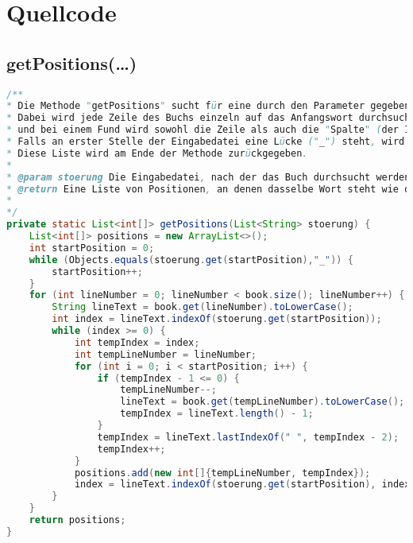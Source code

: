 \documentclass[a4paper, 10pt, ngerman]{scrartcl}
\begin{document}
\section{Quellcode}\label{sec:quellcode}
\subsection{getPositions(\ldots)}\label{sec:getPositions()}
\begin{lstlisting}[frame=single, language=Java, title=Methode getPositions, breaklines=true, label=lst:getPosition]
/**
* Die Methode "getPositions" sucht für eine durch den Parameter gegebene Eingabedatei das erste Wort im Buch.
* Dabei wird jede Zeile des Buchs einzeln auf das Anfangswort durchsucht
* und bei einem Fund wird sowohl die Zeile als auch die "Spalte" (der Index in der Zeile, an der das Wort beginnt) als Array an die Liste von Positionen hinzugefügt.
* Falls an erster Stelle der Eingabedatei eine Lücke ("_") steht, wird nach dem zweiten Wort gesucht und dann die Position für das vorherige Wort bestimmt.
* Diese Liste wird am Ende der Methode zurückgegeben.
*
* @param stoerung Die Eingabedatei, nach der das Buch durchsucht werden soll
* @return Eine Liste von Positionen, an denen dasselbe Wort steht wie das erste Wort der Eingabedatei
*
*/
private static List<int[]> getPositions(List<String> stoerung) {
	List<int[]> positions = new ArrayList<>();
    int startPosition = 0;
    while (Objects.equals(stoerung.get(startPosition),"_")) {
    	startPosition++;
    }
    for (int lineNumber = 0; lineNumber < book.size(); lineNumber++) {
        String lineText = book.get(lineNumber).toLowerCase();
        int index = lineText.indexOf(stoerung.get(startPosition));
        while (index >= 0) {
        	int tempIndex = index;
            int tempLineNumber = lineNumber;
            for (int i = 0; i < startPosition; i++) {
                if (tempIndex - 1 <= 0) {
                    tempLineNumber--;
                    lineText = book.get(tempLineNumber).toLowerCase();
                    tempIndex = lineText.length() - 1;
                }
                tempIndex = lineText.lastIndexOf(" ", tempIndex - 2);
                tempIndex++;
            }
            positions.add(new int[]{tempLineNumber, tempIndex});
            index = lineText.indexOf(stoerung.get(startPosition), index + 1);
        }
    }
    return positions;
}
\end{lstlisting}
\clearpage
\end{document}
